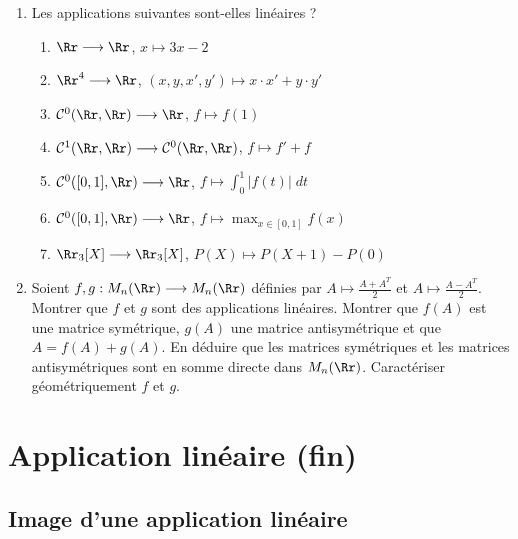 \documentclass[class=report,crop=false]{standalone}
\begin{document}
\begin{miniexercices}
\sauteligne
\begin{enumerate}

  \item Les applications suivantes sont-elles linéaires ?
  \begin{enumerate}
    \item $\Rr \longrightarrow \Rr$, \quad $x \longmapsto 3x-2$
    \item $\Rr^4 \longrightarrow \Rr$, \quad $(x,y,x',y') \longmapsto x\cdot x' + y \cdot y'$
    \item $\mathcal{C}^0(\Rr,\Rr) \longrightarrow \Rr$, \quad $f \longmapsto f(1)$
    \item $\mathcal{C}^1(\Rr,\Rr) \longrightarrow \mathcal{C}^0(\Rr,\Rr)$, \quad $f \longmapsto f'+f$
    \item $\mathcal{C}^0([0,1],\Rr) \longrightarrow \Rr$, \quad $f \longmapsto \int_0^1 |f(t)|\; dt$
    \item $\mathcal{C}^0([0,1],\Rr) \longrightarrow \Rr$, \quad $f \longmapsto \max_{x\in [0,1]} f(x)$
    \item $\Rr_3[X] \longrightarrow \Rr_3[X]$, \quad $P(X) \longmapsto P(X+1) - P(0)$
  \end{enumerate}

  \item Soient $f,g : M_n(\Rr) \longrightarrow M_n(\Rr)$
  définies par $A \longmapsto \frac{A+A^T}{2}$ et $A \longmapsto \frac{A-A^T}{2}$.
  Montrer que $f$ et $g$ sont des applications linéaires.
  Montrer que $f(A)$ est une matrice symétrique, $g(A)$ une matrice antisymétrique
  et que $A = f(A)+g(A)$. En déduire que les matrices symétriques et les matrices antisymétriques sont en somme
  directe dans $M_n(\Rr)$. Caractériser géométriquement $f$ et $g$.
\end{enumerate}
\end{miniexercices}


\section{Application linéaire (fin)}

\subsection{Image d'une application linéaire}
\end{document}
